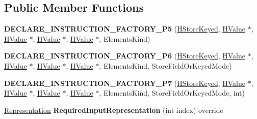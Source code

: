 \subsection*{Public Member Functions}
\begin{DoxyCompactItemize}
\item 
{\bfseries D\+E\+C\+L\+A\+R\+E\+\_\+\+I\+N\+S\+T\+R\+U\+C\+T\+I\+O\+N\+\_\+\+F\+A\+C\+T\+O\+R\+Y\+\_\+\+P5} (\hyperlink{classv8_1_1internal_1_1_h_store_keyed}{H\+Store\+Keyed}, \hyperlink{classv8_1_1internal_1_1_h_value}{H\+Value} $\ast$, \hyperlink{classv8_1_1internal_1_1_h_value}{H\+Value} $\ast$, \hyperlink{classv8_1_1internal_1_1_h_value}{H\+Value} $\ast$, \hyperlink{classv8_1_1internal_1_1_h_value}{H\+Value} $\ast$, Elements\+Kind)\hypertarget{classv8_1_1internal_1_1_h_store_keyed_a756d81ad98b7ca9271a6e2dcf86c800c}{}\label{classv8_1_1internal_1_1_h_store_keyed_a756d81ad98b7ca9271a6e2dcf86c800c}

\item 
{\bfseries D\+E\+C\+L\+A\+R\+E\+\_\+\+I\+N\+S\+T\+R\+U\+C\+T\+I\+O\+N\+\_\+\+F\+A\+C\+T\+O\+R\+Y\+\_\+\+P6} (\hyperlink{classv8_1_1internal_1_1_h_store_keyed}{H\+Store\+Keyed}, \hyperlink{classv8_1_1internal_1_1_h_value}{H\+Value} $\ast$, \hyperlink{classv8_1_1internal_1_1_h_value}{H\+Value} $\ast$, \hyperlink{classv8_1_1internal_1_1_h_value}{H\+Value} $\ast$, \hyperlink{classv8_1_1internal_1_1_h_value}{H\+Value} $\ast$, Elements\+Kind, Store\+Field\+Or\+Keyed\+Mode)\hypertarget{classv8_1_1internal_1_1_h_store_keyed_ab17d516591ab995a5920c4a0edb78464}{}\label{classv8_1_1internal_1_1_h_store_keyed_ab17d516591ab995a5920c4a0edb78464}

\item 
{\bfseries D\+E\+C\+L\+A\+R\+E\+\_\+\+I\+N\+S\+T\+R\+U\+C\+T\+I\+O\+N\+\_\+\+F\+A\+C\+T\+O\+R\+Y\+\_\+\+P7} (\hyperlink{classv8_1_1internal_1_1_h_store_keyed}{H\+Store\+Keyed}, \hyperlink{classv8_1_1internal_1_1_h_value}{H\+Value} $\ast$, \hyperlink{classv8_1_1internal_1_1_h_value}{H\+Value} $\ast$, \hyperlink{classv8_1_1internal_1_1_h_value}{H\+Value} $\ast$, \hyperlink{classv8_1_1internal_1_1_h_value}{H\+Value} $\ast$, Elements\+Kind, Store\+Field\+Or\+Keyed\+Mode, int)\hypertarget{classv8_1_1internal_1_1_h_store_keyed_a9ae960ed29bcdb3154211280bc234c03}{}\label{classv8_1_1internal_1_1_h_store_keyed_a9ae960ed29bcdb3154211280bc234c03}

\item 
\hyperlink{classv8_1_1internal_1_1_representation}{Representation} {\bfseries Required\+Input\+Representation} (int index) override\hypertarget{classv8_1_1internal_1_1_h_store_keyed_a03ab8b4274d903e0b06238b04aaea12b}{}\label{classv8_1_1internal_1_1_h_store_keyed_a03ab8b4274d903e0b06238b04aaea12b}


\end{DoxyCompactItemize}
